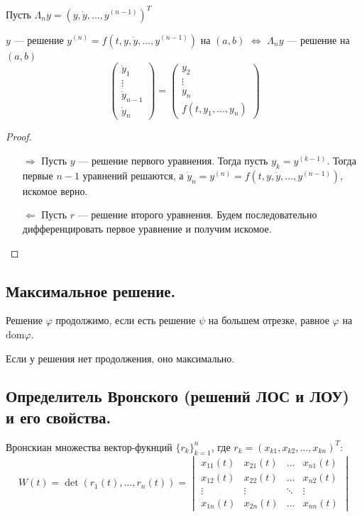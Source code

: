 Пусть \(\Lambda_n y = (y, \dot{y}, \dots , y^{(n - 1)})^T\)

\begin{lemma}
    \(y\) --- решение \(y^{(n)} = f(t, y, \dot{y}, \dots , y^{(n - 1)})\) на \((a, b)\) \(\Leftrightarrow\) \(\Lambda_n y\) --- решение на \((a, b)\) \[\begin{pmatrix} \dot{y}_1 \\ \vdots \\ \dot{y}_{n - 1} \\ \dot{y}_{n} \end{pmatrix} = \begin{pmatrix} y_2 \\ \vdots \\ y_n \\ f(t, y_1, \dots , y_n) \end{pmatrix} \]
\end{lemma}
\begin{proof}\itemfix
    \begin{itemize}
        \item [\( \Rightarrow \)] Пусть \(y\) --- решение первого уравнения. Тогда пусть \(y_k = y^{(k - 1)}\). Тогда первые \(n - 1\) уравнений решаются, а \(\dot{y}_n = y^{(n)} = f(t, y, \dot{y}, \dots , y^{(n - 1)})\), искомое верно.
        \item [\( \Leftarrow \)] Пусть \(r\) --- решение второго уравнения. Будем последовательно дифференцировать первое уравнение и получим искомое.
    \end{itemize}
\end{proof}

\subsection*{Максимальное решение.}

Решение \(\varphi\) продолжимо, если есть решение \(\psi\) на большем отрезке, равное \(\varphi\) на \(\text{dom} \varphi\).

Если у решения нет продолжения, оно максимально.

\subsection*{Определитель Вронского (решений ЛОС и ЛОУ) и его свойства.}

Вронскиан множества вектор-фукнций \(\{r_k\}_{k = 1}^n\), где \(r_k = (x_{k1}, x_{k2}, \dots, x_{kn})^T\):
\[W(t) = \det (r_1(t), \dots , r_n(t)) = \begin{vmatrix} x_{11}(t) & x_{21}(t) & \dots & x_{n1}(t) \\ x_{12}(t) & x_{22}(t) & \dots & x_{n2}(t) \\ \vdots & \vdots & \ddots & \vdots \\ x_{1n}(t) & x_{2n}(t) & \dots & x_{nn}(t) \end{vmatrix} \]

